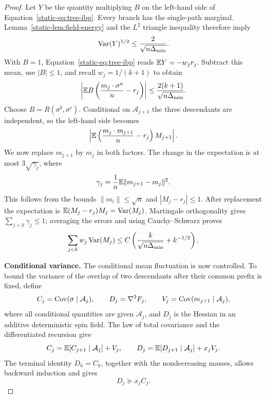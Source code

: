 \begin{proof}
Let $Y$ be the quantity multiplying $B$ on the left-hand side of
Equation~\eqref{static-eq:tree-ibp}. Every branch has the single-path
marginal. Lemma~\ref{static-lem:field-energy} and the $L^2$ triangle
inequality therefore imply
\[
 \operatorname{Var}(Y)^{1/2}\le\frac{2}{\sqrt{n\Delta_{\min}}}.
\]
With $B=1$, Equation~\eqref{static-eq:tree-ibp} reads
$\mathbb E Y=-w_jr_j$. Subtract this mean, use $|B|\le1$, and recall
$w_j=1/(k+1)$ to obtain
\begin{equation}\label{static-eq:tree-centered}
 \left|\mathbb E B\left(\frac{m_j\cdot\sigma^a}{n}-r_j\right)\right|
 \le\frac{2(k+1)}{\sqrt{n\Delta_{\min}}}.
\end{equation}
Choose $B=R(\sigma^b,\sigma^c)$. Conditional on
$\mathcal A_{j+1}$ the three descendants are independent, so the
left-hand side becomes
\[
 \left|\mathbb E\left(\frac{m_j\cdot m_{j+1}}n-r_j\right)M_{j+1}\right|.
\]
We now replace $m_{j+1}$ by $m_j$ in both factors. The change in the
expectation is at most $3\sqrt{\gamma_j}$, where
\[
 \gamma_j=\frac1n\mathbb E\|m_{j+1}-m_j\|^2.
\]
This follows from the bounds $\|m_l\|\le\sqrt n$ and
$|M_j-r_j|\le1$. After replacement the expectation is
$\mathbb E(M_j-r_j)M_j=\operatorname{Var}(M_j)$. Martingale orthogonality gives
$\sum_{j<k}\gamma_j\le1$; averaging the errors and using
Cauchy--Schwarz proves
\begin{equation}\label{static-eq:mean-overlap-variance}
 \sum_{j<k}w_j\operatorname{Var}(M_j)
 \le C\left(\frac{k}{\sqrt{n\Delta_{\min}}}+k^{-1/2}\right).
\end{equation}

\par\medskip\noindent\textbf{Conditional variance.}\enspace
The conditional mean fluctuation is now controlled. To bound the
variance of the overlap of two descendants after their common prefix
is fixed, define
\[
 C_j=\operatorname{Cov}(\sigma\mid\mathcal A_j),\qquad
 D_j=\nabla^2F_j,\qquad
 V_j=\operatorname{Cov}(m_{j+1}\mid\mathcal A_j),
\]
where all conditional quantities are given $\mathcal A_j$, and
$D_j$ is the Hessian in an additive deterministic spin field. The
law of total covariance and the differentiated recursion give
\[
 C_j=\mathbb E[C_{j+1}\mid\mathcal A_j]+V_j,
 \qquad
 D_j=\mathbb E[D_{j+1}\mid\mathcal A_j]+x_jV_j.
\]
The terminal identity $D_k=C_k$, together with the nondecreasing
masses, allows backward induction and gives
\begin{equation}\label{static-eq:hessian-covariance-bound}
 D_j\succeq x_jC_j.
\end{equation}


\end{proof}
